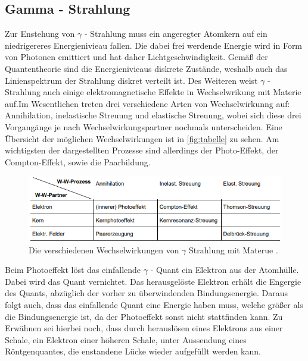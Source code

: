 \subsection{Gamma - Strahlung}
Zur Enstehung von $\gamma$ - Strahlung muss ein angeregter Atomkern auf ein niedrigereres Energienivieau fallen. Die dabei frei werdende 
Energie wird in Form von Photonen emittiert und hat daher Lichtgeschwindigkeit. Gemäß der Quantentheorie sind die Energienivieaus diskrete
Zustände, weshalb auch das Linienspektrum der Strahlung diskret verteilt ist. Des Weiteren weist $\gamma$ - Strahlung auch einige elektromagnetische 
Effekte in Wechselwrikung mit Materie auf.Im Wesentlichen treten drei verschiedene Arten von Wechselwirkunng auf: Annihilation, inelastische 
Streuung und elastische Streuung, wobei sich diese drei Vorgangänge je nach Wechselwirkungspartner nochmals unterscheiden. Eine Übersicht der
möglichen Wechselwirkungen ist in \autoref{fig:tabelle} zu sehen. Am wichtigsten der dargestellten Prozesse sind allerdings der Photo-Effekt,
der Compton-Effekt, sowie die Paarbildung. 
\begin{figure}
        \centering
        \includegraphics[width=\textwidth]{content/tabelle.png}
        \caption{Die verschiedenen Wechselwirkungen von $\gamma$ Strahlung mit Materue \cite[233]{V704}.}
        \label{fig:tabelle}
    \end{figure}

Beim Photoeffekt löst das einfallende $\gamma$ - Quant ein Elektron aus der Atomhülle. Dabei wird das Quant vernichtet. Das herausgelöste
Elektron erhält die Engergie des Quants, abzüglich der vorher zu überwindenden Bindungsenergie. Daraus folgt auch, dass das einfallende 
Quant eine Energie haben muss, welche größer als die Bindungsenergie ist, da der Photoeffekt sonst nicht stattfinden kann.
Zu Erwähnen sei hierbei noch, dass durch herauslösen eines Elektrons aus einer Schale, ein Elektron einer höheren Schale, unter Aussendung eines
Röntgenquantes, die enstandene Lücke wieder aufgefüllt werden kann.


